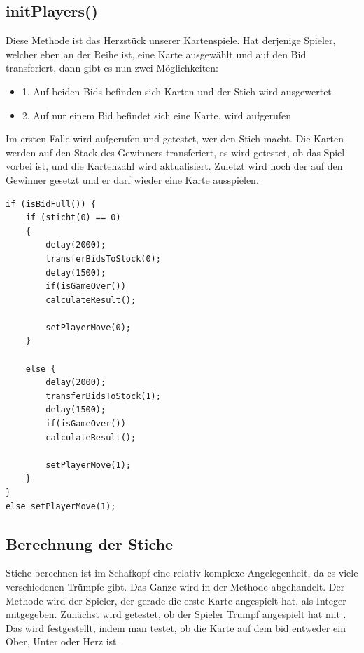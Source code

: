 \subsection{initPlayers()}

Diese Methode ist das Herzstück unserer Kartenspiele. Hat derjenige Spieler,
welcher eben an der Reihe ist, eine Karte ausgewählt und auf den Bid
transferiert, dann gibt es nun zwei Möglichkeiten:

\begin{itemize}
	\item 1. Auf beiden Bids befinden sich Karten und der Stich wird ausgewertet
	\item 2. Auf nur einem Bid befindet sich eine Karte,  wird 		 aufgerufen
\end{itemize}

Im ersten Falle wird  aufgerufen und getestet, wer den Stich
macht. Die Karten werden auf den Stack des Gewinners transferiert, es wird
getestet, ob das Spiel vorbei ist, und die Kartenzahl wird aktualisiert.
Zuletzt wird noch der  auf den Gewinner gesetzt und er darf
wieder eine Karte ausspielen.

\begin{lstlisting}[caption={initPlayers gamecycle},captionpos=b]
if (isBidFull()) {
    if (sticht(0) == 0)
    {
        delay(2000);
        transferBidsToStock(0);
        delay(1500);
        if(isGameOver())
        calculateResult();

        setPlayerMove(0);
    }

    else {
        delay(2000);
        transferBidsToStock(1);
        delay(1500);
        if(isGameOver())
        calculateResult();

        setPlayerMove(1);
    }
}
else setPlayerMove(1);
\end{lstlisting}

\subsection{Berechnung der Stiche}

Stiche berechnen ist im Schafkopf eine relativ komplexe Angelegenheit, da es
viele verschiedenen Trümpfe gibt. Das Ganze wird in der Methode
 abgehandelt. Der Methode wird der Spieler, der gerade
die erste Karte angespielt hat, als Integer mitgegeben. Zunächst wird getestet,
ob der Spieler Trumpf angespielt hat mit . Das wird
festgestellt, indem man testet, ob die Karte auf dem bid entweder ein Ober,
Unter oder Herz ist.

